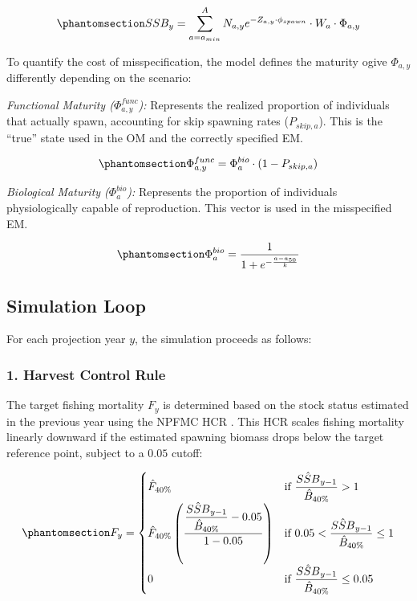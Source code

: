 \documentclass[
  authoryear,
  preprint,
  3p]{elsarticle}
\begin{document}
\begin{equation}\protect\phantomsection\label{eq-ssb}{
SSB_y = \sum_{a=a_{min}}^{A} N_{a,y} e^{-Z_{a,y} \cdot \phi_{spawn}} \cdot W_a \cdot \Phi_{a,y}
}\end{equation}

To quantify the cost of misspecification, the model defines the maturity
ogive \(\Phi_{a,y}\) differently depending on the scenario:

\emph{Functional Maturity (\(\Phi^{func}_{a,y}\)):} Represents the
realized proportion of individuals that actually spawn, accounting for
skip spawning rates (\(P_{skip, a}\)). This is the ``true'' state used
in the OM and the correctly specified EM.

\begin{equation}\protect\phantomsection\label{eq-func-mat}{
\Phi^{func}_{a,y} = \Phi^{bio}_{a} \cdot (1 - P_{skip, a})
}\end{equation}

\emph{Biological Maturity (\(\Phi^{bio}_{a}\)):} Represents the
proportion of individuals physiologically capable of reproduction. This
vector is used in the misspecified EM.

\begin{equation}\protect\phantomsection\label{eq-bio-mat}{
\Phi^{bio}_{a} = \frac{1}{1 + e^{-\frac{a - a_{50}}{k}}}
}\end{equation}

\subsection{Simulation Loop}\label{simulation-loop}

For each projection year \(y\), the simulation proceeds as follows:

\subsubsection{1. Harvest Control Rule}\label{harvest-control-rule}

The target fishing mortality \(F_{y}\) is determined based on the stock
status estimated in the previous year using the NPFMC HCR
\citep{Dorn2020}. This HCR scales fishing mortality linearly downward if
the estimated spawning biomass drops below the target reference point,
subject to a \(0.05\) cutoff:

\begin{equation}\protect\phantomsection\label{eq-hcr}{
F_y = \begin{cases}
\hat{F}_{40\%} & \text{if } \dfrac{\hat{SSB}_{y-1}}{\hat{B}_{40\%}} > 1 \\
\hat{F}_{40\%} \left( \dfrac{\dfrac{\hat{SSB}_{y-1}}{\hat{B}_{40\%}} - 0.05}{1 - 0.05} \right) & \text{if } 0.05 < \dfrac{\hat{SSB}_{y-1}}{\hat{B}_{40\%}} \le 1 \\
0 & \text{if } \dfrac{\hat{SSB}_{y-1}}{\hat{B}_{40\%}} \le 0.05
\end{cases}
}\end{equation}
\end{document}

